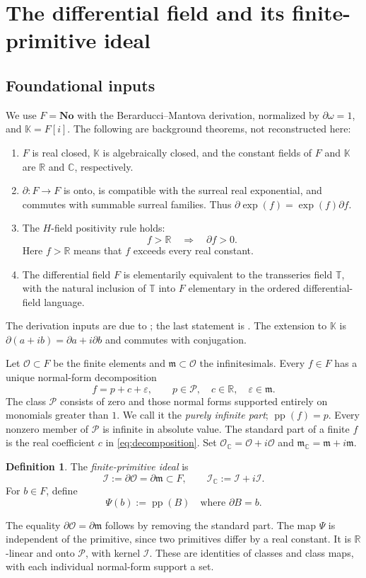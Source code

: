 \documentclass[11pt,a4paper]{article}
\numberwithin{equation}{section}
\theoremstyle{definition}
\newtheorem{definition}[definition]{Definition}
\theoremstyle{remark}
\newcommand{\No}{\mathbf{No}}
\newcommand{\K}{\mathbb K}
\newcommand{\R}{\mathbb R}
\newcommand{\C}{\mathbb C}
\newcommand{\T}{\mathbb T}
\newcommand{\OO}{\mathcal O}
\newcommand{\mm}{\mathfrak m}
\newcommand{\PP}{\mathcal P}
\newcommand{\II}{\mathcal I}
\newcommand{\pp}{\operatorname{pp}}
\begin{document}
\section{The differential field and its finite-primitive ideal}\label{sec:ideal}

\subsection{Foundational inputs}
We use $F=\No$ with the Berarducci--Mantova derivation, normalized by
$\partial\omega=1$, and $\K=F[i]$. The following are background theorems,
not reconstructed here:
\begin{enumerate}
\item $F$ is real closed, $\K$ is algebraically closed, and the constant
fields of $F$ and $\K$ are $\R$ and $\C$, respectively.
\item $\partial:F\to F$ is onto, is compatible with the surreal real
exponential, and commutes with summable surreal families. Thus
$\partial\exp(f)=\exp(f)\partial f$.
\item The $H$-field positivity rule holds:
\[
 f>\R\quad\Longrightarrow\quad\partial f>0.
\]
Here $f>\R$ means that $f$ exceeds every real constant.
\item The differential field $F$ is elementarily equivalent to the
transseries field $\T$, with the natural inclusion of $\T$ into $F$
elementary in the ordered differential-field language.
\end{enumerate}
The derivation inputs are due to \cite{BM}; the last statement is
\cite[Theorem 1]{ADHSur}. The extension to $\K$ is
$\partial(a+ib)=\partial a+i\partial b$ and commutes with conjugation.

Let $\OO\subset F$ be the finite elements and $\mm\subset\OO$ the
infinitesimals. Every $f\in F$ has a unique normal-form decomposition
\begin{equation}\label{eq:decomposition}
 f=p+c+\varepsilon,
 \qquad p\in\PP,\quad c\in\R,\quad\varepsilon\in\mm.
\end{equation}
The class $\PP$ consists of zero and those normal forms supported entirely
on monomials greater than $1$. We call it the \emph{purely infinite part};
$\pp(f)=p$. Every nonzero member of $\PP$ is infinite in absolute value.
The standard part of a finite $f$ is the real coefficient $c$ in
\eqref{eq:decomposition}. Set
$\OO_{\C}=\OO+i\OO$ and $\mm_{\C}=\mm+i\mm$.

\begin{definition}
The \emph{finite-primitive ideal} is
\[
 \II:=\partial\OO=\partial\mm\subset F,
 \qquad \II_{\C}:=\II+i\II.
\]
For $b\in F$, define
\begin{equation}\label{eq:Psi}
 \Psi(b):=\pp(B)\quad\text{where }\partial B=b.
\end{equation}
\end{definition}
The equality $\partial\OO=\partial\mm$ follows by removing the standard
part. The map $\Psi$ is independent of the primitive, since two primitives
differ by a real constant. It is $\R$-linear and onto $\PP$, with kernel
$\II$. These are identities of classes and class maps, with each individual
normal-form support a set.
\end{document}
